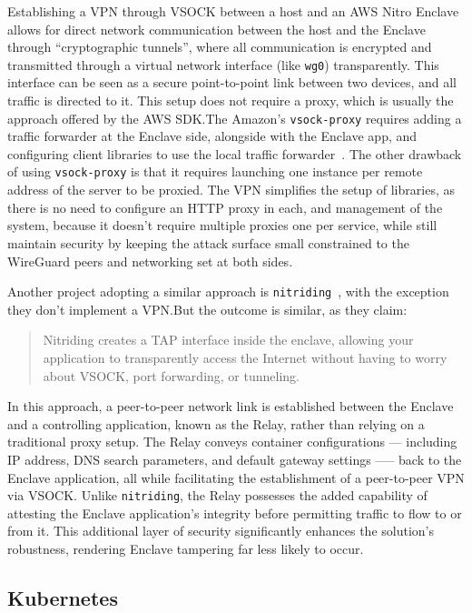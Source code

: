 \documentclass[a4paper, twocolumn]{article}
\begin{document}
Establishing a VPN through VSOCK between a host and an AWS Nitro Enclave allows
for direct network communication between the host and the Enclave through
``cryptographic tunnels'', where all communication is encrypted and transmitted
through a virtual network interface (like \texttt{wg0}) transparently. This
interface can be seen as a secure point-to-point link between two devices, and
all traffic is directed to it. This setup does not require a proxy, which is
usually the approach offered by the AWS SDK.\@ The Amazon's \texttt{vsock-proxy}
requires adding a traffic forwarder at the Enclave side, alongside with the
Enclave app, and configuring client libraries to use the local traffic
forwarder~\cite{vsockproxy_2023}. The other drawback of using
\texttt{vsock-proxy} is that it requires launching one instance per remote
address of the server to be proxied. The VPN simplifies the setup of libraries,
as there is no need to configure an HTTP proxy in each, and management of the
system, because it doesn't require multiple proxies one per service, while
still maintain security by keeping the attack surface small constrained to the
WireGuard peers and networking set at both sides.

Another project adopting a similar approach is
\texttt{nitriding}~\cite{winter2022framework}, with the exception they don't
implement a VPN.\@ But the outcome is similar, as they claim:

\begin{quote}
Nitriding creates a TAP interface inside the enclave, allowing your application
to transparently access the Internet without having to worry about VSOCK,
port forwarding, or tunneling.
\end{quote}

In this approach, a peer-to-peer network link is established between the
Enclave and a controlling application, known as the Relay, rather than relying
on a traditional proxy setup. The Relay conveys container configurations ---
including IP address, DNS search parameters, and default gateway settings —--
back to the Enclave application, all while facilitating the establishment of a
peer-to-peer VPN via VSOCK\@. Unlike \texttt{nitriding}, the Relay possesses
the added capability of attesting the Enclave application's integrity before
permitting traffic to flow to or from it. This additional layer of security
significantly enhances the solution's robustness, rendering Enclave tampering
far less likely to occur.

\subsection{Kubernetes}\label{sec:kubernetes}
\end{document}
